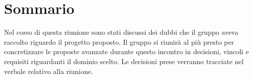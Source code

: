 \section{Sommario}
Nel	corso di questa riunione sono stati discussi dei dubbi che il gruppo aveva raccolto riguardo il progetto proposto. 
Il gruppo si riunirà al più presto per concretizzare le proposte avanzate durante questo incontro in decisioni, vincoli e requisiti riguardanti il dominio scelto. Le decisioni prese verranno tracciate nel verbale relativo alla riunione.